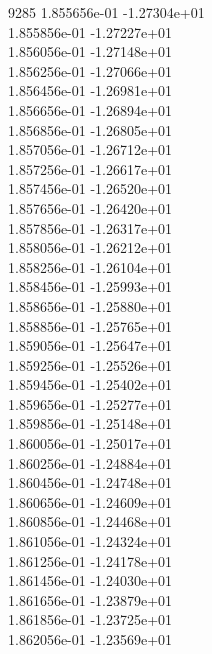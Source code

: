 9285	1.855656e-01	-1.27304e+01	\\ 	1.855856e-01	-1.27227e+01	\\ 	1.856056e-01	-1.27148e+01	\\ 	1.856256e-01	-1.27066e+01	\\ 	1.856456e-01	-1.26981e+01	\\ 	1.856656e-01	-1.26894e+01	\\ 	1.856856e-01	-1.26805e+01	\\ 	1.857056e-01	-1.26712e+01	\\ 	1.857256e-01	-1.26617e+01	\\ 	1.857456e-01	-1.26520e+01	\\ 	1.857656e-01	-1.26420e+01	\\ 	1.857856e-01	-1.26317e+01	\\ 	1.858056e-01	-1.26212e+01	\\ 	1.858256e-01	-1.26104e+01	\\ 	1.858456e-01	-1.25993e+01	\\ 	1.858656e-01	-1.25880e+01	\\ 	1.858856e-01	-1.25765e+01	\\ 	1.859056e-01	-1.25647e+01	\\ 	1.859256e-01	-1.25526e+01	\\ 	1.859456e-01	-1.25402e+01	\\ 	1.859656e-01	-1.25277e+01	\\ 	1.859856e-01	-1.25148e+01	\\ 	1.860056e-01	-1.25017e+01	\\ 	1.860256e-01	-1.24884e+01	\\ 	1.860456e-01	-1.24748e+01	\\ 	1.860656e-01	-1.24609e+01	\\ 	1.860856e-01	-1.24468e+01	\\ 	1.861056e-01	-1.24324e+01	\\ 	1.861256e-01	-1.24178e+01	\\ 	1.861456e-01	-1.24030e+01	\\ 	1.861656e-01	-1.23879e+01	\\ 	1.861856e-01	-1.23725e+01	\\ 	1.862056e-01	-1.23569e+01	\\ \hline
